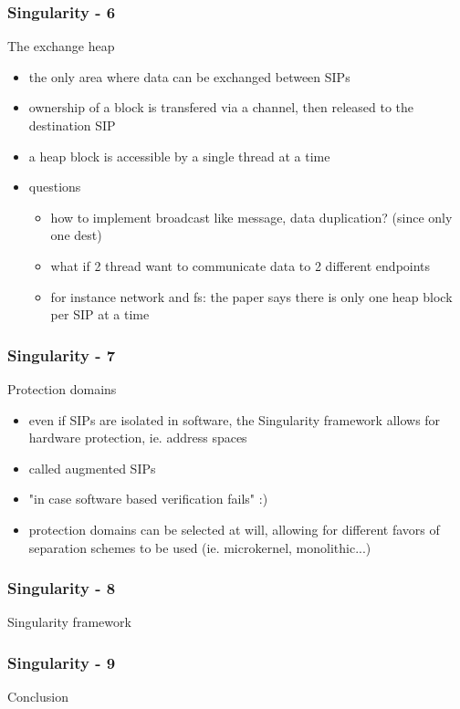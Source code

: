 \begin{frame}
  \frametitle{Singularity - 6}
  The exchange heap
 
 \begin{itemize}
   \item the only area where data can be exchanged between SIPs
   \item ownership of a block is transfered via a channel, then released to the destination SIP
   \item a heap block is accessible by a single thread at a time
   \item questions
     \begin{itemize}
       \item how to implement broadcast like message, data duplication? (since only one dest)
       \item what if 2 thread want to communicate data to 2 different endpoints
       \item for instance network and fs: the paper says there is only one heap block per SIP at a time
     \end{itemize}
 \end{itemize}
\end{frame}


\begin{frame}
  \frametitle{Singularity - 7}
  Protection domains
 
  \begin{itemize}
    \item even if SIPs are isolated in software, the Singularity framework allows for hardware protection, ie. address spaces
    \item called augmented SIPs
    \item "in case software based verification fails" :)
    \item protection domains can be selected at will, allowing for different favors of separation schemes to be used (ie. microkernel, monolithic...)
  \end{itemize}
\end{frame}


\begin{frame}
  \frametitle{Singularity - 8}
  Singularity framework
\end{frame}


\begin{frame}
  \frametitle{Singularity - 9}
  Conclusion
\end{frame}


%
%


